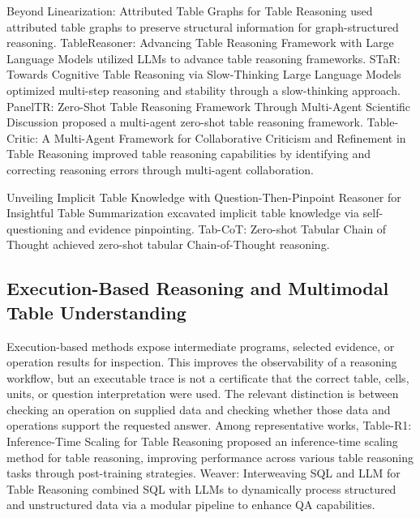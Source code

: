 Beyond Linearization: Attributed Table Graphs for Table Reasoning \cite{gao2024attributedtablegraph} used attributed table graphs to preserve structural information for graph-structured reasoning. TableReasoner: Advancing Table Reasoning Framework with Large Language Models \cite{singh2024tablereasoner} utilized LLMs to advance table reasoning frameworks. STaR: Towards Cognitive Table Reasoning via Slow-Thinking Large Language Models \cite{wang2024starcognitive} optimized multi-step reasoning and stability through a slow-thinking approach. PanelTR: Zero-Shot Table Reasoning Framework Through Multi-Agent Scientific Discussion \cite{liu2024paneltr} proposed a multi-agent zero-shot table reasoning framework. Table-Critic: A Multi-Agent Framework for Collaborative Criticism and Refinement in Table Reasoning \cite{zhang2024tablecritic} improved table reasoning capabilities by identifying and correcting reasoning errors through multi-agent collaboration.

Unveiling Implicit Table Knowledge with Question-Then-Pinpoint Reasoner for Insightful Table Summarization \cite{kim2024qtp} excavated implicit table knowledge via self-questioning and evidence pinpointing. Tab-CoT: Zero-shot Tabular Chain of Thought \cite{li2024tabcot} achieved zero-shot tabular Chain-of-Thought reasoning.

\subsection{Execution-Based Reasoning and Multimodal Table Understanding}
Execution-based methods expose intermediate programs, selected evidence, or operation results for inspection. This improves the observability of a reasoning workflow, but an executable trace is not a certificate that the correct table, cells, units, or question interpretation were used. The relevant distinction is between checking an operation on supplied data and checking whether those data and operations support the requested answer. Among representative works, Table-R1: Inference-Time Scaling for Table Reasoning \cite{yang2025tablegpt1} proposed an inference-time scaling method for table reasoning, improving performance across various table reasoning tasks through post-training strategies. Weaver: Interweaving SQL and LLM for Table Reasoning \cite{weaver2025} combined SQL with LLMs to dynamically process structured and unstructured data via a modular pipeline to enhance QA capabilities.

